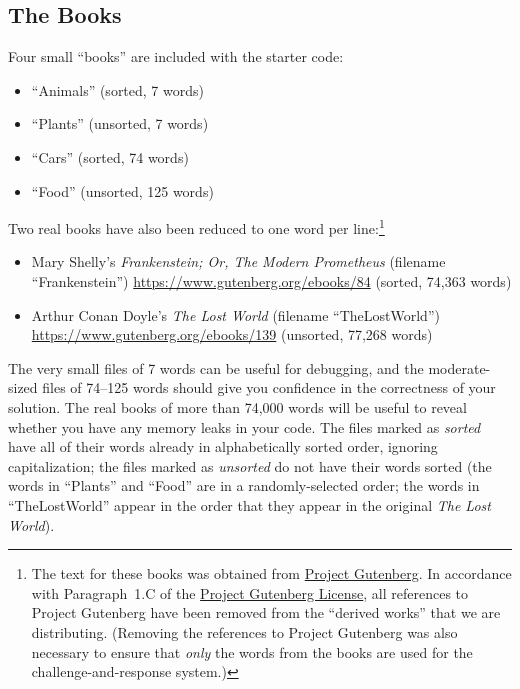 \subsection*{The Books}

Four small ``books'' are included with the starter code:

\begin{itemize}
    \item ``Animals'' (sorted, 7 words)
    \item ``Plants'' (unsorted, 7 words)
    \item ``Cars'' (sorted, 74 words)
    \item ``Food'' (unsorted, 125 words)
\end{itemize}

Two real books have also been reduced to one word per line:\footnote{The text for these books was obtained from \href{https://www.gutenberg.org/}{Project Gutenberg}.
In accordance with Paragraph~1.C of the \href{https://www.gutenberg.org/policy/license}{Project Gutenberg License}, all references to Project Gutenberg have been removed from the ``derived works'' that we are distributing.
(Removing the references to Project Gutenberg was also necessary to ensure that \textit{only} the words from the books are used for the challenge-and-response system.)}

\begin{itemize}
    \item Mary Shelly's \textit{Frankenstein; Or, The Modern Prometheus} (filename ``Frankenstein'') \url{https://www.gutenberg.org/ebooks/84} (sorted, 74,363 words)
    \item Arthur Conan Doyle's \textit{The Lost World} (filename ``TheLostWorld'')
    \url{https://www.gutenberg.org/ebooks/139} (unsorted, 77,268 words)
\end{itemize}

The very small files of 7 words can be useful for debugging, and the moderate-sized files of 74--125 words should give you confidence in the correctness of your solution.
The real books of more than 74,000 words will be useful to reveal whether you have any memory leaks in your code.
The files marked as \textit{sorted} have all of their words already in alphabetically sorted order, ignoring capitalization;
the files marked as \textit{unsorted} do not have their words sorted (the words in ``Plants'' and ``Food'' are in a randomly-selected order;
the words in ``TheLostWorld'' appear in the order that they appear in the original \textit{The Lost World}).


